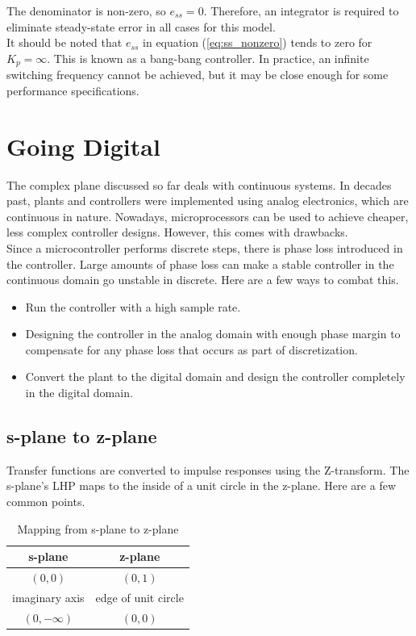 \documentclass[10pt,conference,compsoc]{IEEEtran}
\begin{document}
\noindent The denominator is non-zero, so $e_{ss} = 0$. Therefore, an integrator
is required to eliminate \gls{steady-state error} in all cases for this model.
\\

\noindent It should be noted that $e_{ss}$ in equation (\ref{eq:ss_nonzero})
tends to zero for $K_p = \infty$. This is known as a bang-bang controller. In
practice, an infinite switching frequency cannot be achieved, but it may be
close enough for some performance specifications.

\section{Going Digital}

\noindent The complex plane discussed so far deals with continuous
\glspl{system}. In decades past, \glspl{plant} and controllers were implemented
using analog electronics, which are continuous in nature. Nowadays,
microprocessors can be used to achieve cheaper, less complex controller designs.
However, this comes with drawbacks. \\

\noindent Since a microcontroller performs discrete steps, there is phase loss
introduced in the controller. Large amounts of phase loss can make a stable
controller in the continuous domain go unstable in discrete. Here are a few ways
to combat this.

\begin{itemize}
  \item Run the controller with a high sample rate.
  \item Designing the controller in the analog domain with enough phase margin
    to compensate for any phase loss that occurs as part of discretization.
  \item Convert the \gls{plant} to the digital domain and design the controller
    completely in the digital domain.
\end{itemize}

\subsection{s-plane to z-plane}

\noindent Transfer functions are converted to impulse responses using the
Z-transform. The s-plane's LHP maps to the inside of a unit circle in the
z-plane. Here are a few common points.

\begin{table}[ht]
  \caption{Mapping from s-plane to z-plane}
  \renewcommand{\arraystretch}{1.3}
  \centering
  \begin{tabular}{|cc|}
    \hline
    \textbf{s-plane} & \textbf{z-plane} \\
    \hline
    $(0, 0)$ & $(0, 1)$ \\
    imaginary axis & edge of unit circle \\
    $(0, -\infty)$ & $(0, 0)$ \\
    \hline
  \end{tabular}
  \label{tab:s-plane2z-plane}
\end{table}
\end{document}
